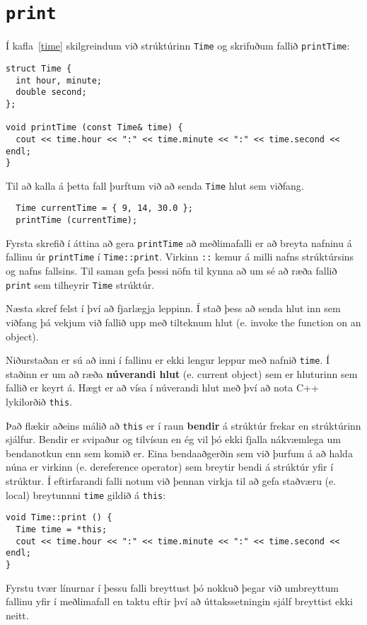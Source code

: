 \section{{\tt print}}

Í kafla~\ref{time} skilgreindum við strúktúrinn {\tt Time}
og skrifuðum fallið {\tt printTime}:

\begin{verbatim}
struct Time {
  int hour, minute;
  double second;
};

void printTime (const Time& time) {
  cout << time.hour << ":" << time.minute << ":" << time.second << endl;
}
\end{verbatim}
%
Til að kalla á þetta fall þurftum við að senda {\tt Time} hlut sem viðfang. 

\begin{verbatim}
  Time currentTime = { 9, 14, 30.0 };
  printTime (currentTime);
\end{verbatim}
%
Fyrsta skrefið í áttina að gera {\tt printTime} að meðlimafalli er að breyta nafninu á fallinu úr {\tt printTime} í {\tt Time::print}.
Virkinn {\tt ::} kemur á milli nafns strúktúrsins og nafns fallsins.
Til saman gefa þessi nöfn til kynna að um sé að ræða fallið {\tt print} sem tilheyrir {\tt Time} strúktúr.

Næsta skref felst í því að fjarlægja leppinn.
Í stað þess að senda hlut inn sem viðfang þá vekjum við fallið upp með tilteknum hlut (e. invoke the function on an object).

Niðurstaðan er sú að inni í fallinu er ekki lengur leppur með nafnið {\tt time}.
Í staðinn er um að ræða {\bf núverandi hlut} (e. current object) sem er hluturinn sem fallið er keyrt á.
Hægt er að vísa í núverandi hlut með því að nota C++ lykilorðið {\tt this}.


Það flækir aðeins málið að {\tt this} er í raun {\bf bendir} á strúktúr frekar en strúktúrinn sjálfur.
Bendir er svipaður og tilvísun en ég vil þó ekki fjalla nákvæmlega um bendanotkun enn sem komið er.
Eina bendaaðgerðin sem við þurfum á að halda núna er {\tt *} virkinn (e. dereference operator) sem breytir bendi á strúktúr yfir í strúktur.
Í eftirfarandi falli notum við þennan virkja til að gefa staðværu (e. local) breytunnni {\tt time} gildið á {\tt this}:

\begin{verbatim}
void Time::print () {
  Time time = *this;
  cout << time.hour << ":" << time.minute << ":" << time.second << endl;
}
\end{verbatim}
%
Fyrstu tvær línurnar í þessu falli breyttust þó nokkuð þegar við umbreyttum fallinu yfir í meðlimafall 
en taktu eftir því að úttakssetningin sjálf breyttist ekki neitt.

